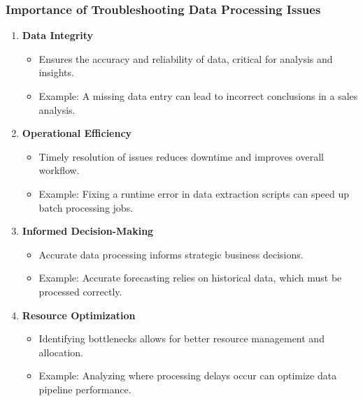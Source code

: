 \documentclass[aspectratio=169]{beamer}
\begin{document}
\begin{frame}[fragile]
    \frametitle{Importance of Troubleshooting Data Processing Issues}
    \begin{enumerate}
        \item \textbf{Data Integrity}
            \begin{itemize}
                \item Ensures the accuracy and reliability of data, critical for analysis and insights.
                \item Example: A missing data entry can lead to incorrect conclusions in a sales analysis.
            \end{itemize}
        \item \textbf{Operational Efficiency}
            \begin{itemize}
                \item Timely resolution of issues reduces downtime and improves overall workflow.
                \item Example: Fixing a runtime error in data extraction scripts can speed up batch processing jobs.
            \end{itemize}
        \item \textbf{Informed Decision-Making}
            \begin{itemize}
                \item Accurate data processing informs strategic business decisions.
                \item Example: Accurate forecasting relies on historical data, which must be processed correctly.
            \end{itemize}
        \item \textbf{Resource Optimization}
            \begin{itemize}
                \item Identifying bottlenecks allows for better resource management and allocation.
                \item Example: Analyzing where processing delays occur can optimize data pipeline performance.
            \end{itemize}
    \end{enumerate}
\end{frame}
\end{document}

